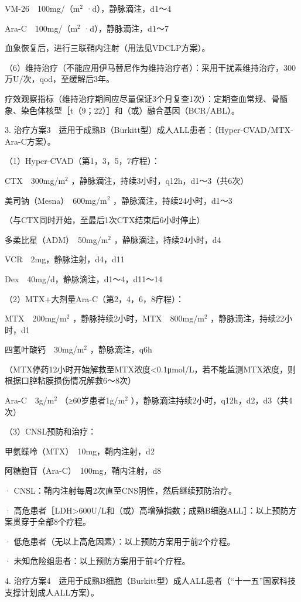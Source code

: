 VM-26　100mg/（m$^2$ ·d），静脉滴注，d1～4

Ara-C　100mg/（m$^2$ ·d），静脉滴注，d1～7

血象恢复后，进行三联鞘内注射（用法见VDCLP方案）。

（6）维持治疗（不能应用伊马替尼作为维持治疗者）：采用干扰素维持治疗，300万U/次，qod，至缓解后3年。

疗效观察指标（维持治疗期间应尽量保证3个月复查1次）：定期查血常规、骨髓象、染色体核型［t（9；22）］和（或）融合基因（BCR/ABL）。

3.
治疗方案3　适用于成熟B（Burkitt型）成人ALL患者：（Hyper-CVAD/MTX-Ara-C方案）。

（1）Hyper-CVAD（第1，3，5，7疗程）：

CTX　300mg/m$^2$
，静脉滴注，持续3小时，q12h，d1～3（共6次）

美司钠（Mesna）　600mg/m$^2$ ，静脉滴注，持续24小时，d1～3

（与CTX同时开始，至最后1次CTX结束后6小时停止）

多柔比星（ADM）　50mg/m$^2$ ，静脉滴注，持续24小时，d4

VCR　2mg，静脉注射，d4，d11

Dex　40mg/d，静脉滴注，d1～4，d11～14

（2）MTX+大剂量Ara-C（第2，4，6，8疗程）：

MTX　200mg/m$^2$ ，静脉持续2小时，MTX　800mg/m$^2$
，静脉滴注，持续22小时，d1

四氢叶酸钙　30mg/m$^2$ ，静脉滴注，q6h

（MTX停药12小时开始解救至MTX浓度<0.1μmol/L，若不能监测MTX浓度，则根据口腔粘膜损伤情况解救6～8次）

Ara-C　3g/m$^2$ （≥60岁患者1g/m$^2$
），静脉滴注持续2小时，q12h，d2，d3（共4次）

（3）CNSL预防和治疗：

甲氨蝶呤（MTX）　10mg，鞘内注射，d2

阿糖胞苷（Ara-C）　100mg，鞘内注射，d8

· CNSL：鞘内注射每周2次直至CNS阴性，然后继续预防治疗。

·
高危患者［LDH\textgreater{}600U/L和（或）高增殖指数；成熟B细胞ALL］：以上预防方案贯穿于全部8个疗程。

· 低危患者（无以上高危因素）：以上预防方案用于前2个疗程。

· 未知危险组患者：以上预防方案用于前4个疗程。

4.
治疗方案4　适用于成熟B细胞（Burkitt型）成人ALL患者（“十一五”国家科技支撑计划成人ALL方案）。

